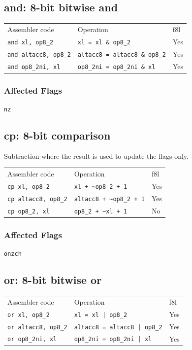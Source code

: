 \documentclass{book}
\begin{document}
\subsection{and: 8-bit bitwise and}

\begin{tabular}{l l l}
Assembler code               & Operation                            & f8l \\
\texttt{and xl, op8\_2}      & \texttt{xl = xl \& op8\_2}           & Yes \\
\texttt{and altacc8, op8\_2} & \texttt{altacc8 = altacc8 \& op8\_2} & Yes \\
\texttt{and op8\_2ni, xl}    & \texttt{op8\_2ni = op8\_2ni \& xl}   & Yes
\end{tabular}

\subsubsection*{Affected Flags}

\texttt{nz}


\subsection{cp: 8-bit comparison}

Subtraction where the result is used to update the flags only.

\begin{tabular}{l l l}
Assembler code              & Operation                         & f8l\\
\texttt{cp xl, op8\_2}      & \texttt{xl + \~{}op8\_2 + 1}      & Yes \\
\texttt{cp altacc8, op8\_2} & \texttt{altacc8 + \~{}op8\_2 + 1} & Yes \\
\texttt{cp op8\_2, xl}      & \texttt{op8\_2 + \~{}xl + 1}      & No
\end{tabular}

\subsubsection*{Affected Flags}

\texttt{onzch}


\subsection{or: 8-bit bitwise or}

\begin{tabular}{l l l}
Assembler code              & Operation                           & f8l \\
\texttt{or xl, op8\_2}      & \texttt{xl = xl | op8\_2}           & Yes \\
\texttt{or altacc8, op8\_2} & \texttt{altacc8 = altacc8 | op8\_2} & Yes \\
\texttt{or op8\_2ni, xl}    & \texttt{op8\_2ni = op8\_2ni | xl}   & Yes
\end{tabular}
\end{document}
